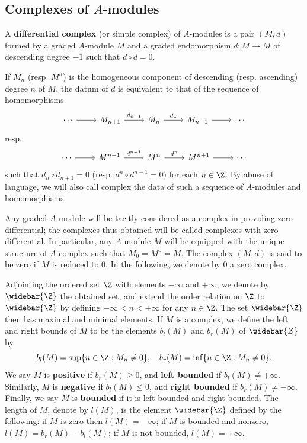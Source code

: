 \subsection{Complexes of \texorpdfstring{$A$}{A}-modules}
A \textbf{differential complex} (or simple complex) of $A$-modules is a pair $(M,d)$ formed by a graded $A$-module $M$ and a graded endomorphism $d:M\to M$ of descending degree $-1$ such that $d\circ d=0$.\par
If $M_n$ (resp. $M^n$) is the homogeneous component of descending (resp. ascending) degree $n$ of $M$, the datum of $d$ is equivalent to that of the sequence of homomorphisms
\[\begin{tikzcd}
\cdots\ar[r]&M_{n+1}\ar[r,"d_{n+1}"]&M_n\ar[r,"d_n"]&M_{n-1}\ar[r]&\cdots
\end{tikzcd}\]
resp.
\[\begin{tikzcd}
\cdots\ar[r]&M^{n-1}\ar[r,"d^{n-1}"]&M^n\ar[r,"d^n"]&M^{n+1}\ar[r]&\cdots
\end{tikzcd}\]
such that $d_n\circ d_{n+1}=0$ (resp. $d^n\circ d^{n-1}=0$) for each $n\in\Z$. By abuse of language, we will also call complex the data of such a sequence of $A$-modules and homomorphisms.\par
Any graded $A$-module will be tacitly considered as a complex in providing zero differential; the complexes thus obtained will be called complexes with zero differential. In particular, any $A$-module $M$ will be equipped with the unique structure of $A$-complex such that $M_0=M^0=M$. The complex $(M,d)$ is said to be zero if $M$ is reduced to $0$. In the following, we denote by $0$ a zero complex.\par
Adjointing the ordered set $\Z$ with elements $-\infty$ and $+\infty$, we denote by $\widebar{\Z}$ the obtained set, and extend the order relation on $\Z$ to $\widebar{\Z}$ by defining $-\infty<n<+\infty$ for any $n\in\Z$. The set $\widebar{\Z}$ then has maximal and minimal elements. If $M$ is a complex, we define the left and right bounds of $M$ to be the elements $b_l(M)$ and $b_r(M)$ of $\widebar{Z}$ by
\[b_l(M)=\sup\{n\in\Z:M_n\neq 0\},\quad b_r(M)=\inf\{n\in\Z:M_n\neq 0\}.\]
We say $M$ is \textbf{positive} if $b_r(M)\geq 0$, and \textbf{left bounded} if $b_l(M)\neq+\infty$. Similarly, $M$ is \textbf{negative} if $b_l(M)\leq 0$, and \textbf{right bounded} if $b_r(M)\neq-\infty$. Finally, we say $M$ is \textbf{bounded} if it is left bounded and right bounded. The length of $M$, denote by $l(M)$, is the element $\widebar{\Z}$ defined by the following: if $M$ is zero then $l(M)=-\infty$; if $M$ is bounded and nonzero, $l(M)=b_r(M)-b_l(M)$; if $M$ is not bounded, $l(M)=+\infty$.\par
